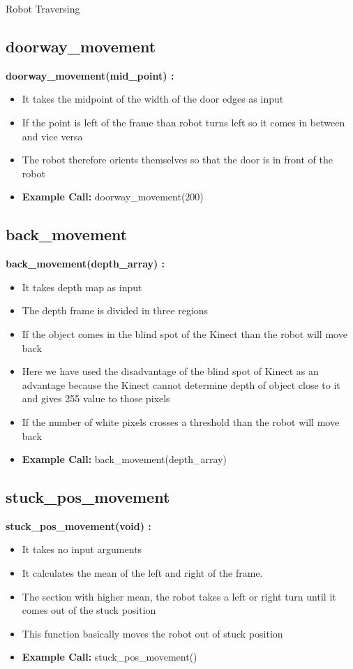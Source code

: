 \documentclass[10pt, a4paper]{beamer}
\begin{document}
\begin{frame}[allowframebreaks]{Robot Traversing}
  \subsection{doorway\_movement}
    \textbf{doorway\_movement(mid\_point) : }
      \begin{itemize}
       \item It takes the midpoint of the width of the door edges as input
       \item If the point is left of the frame than robot turns left so it comes in between and vice versa
       \item The robot therefore orients themselves so that the door is in front of the robot
       \item \textbf{Example Call:} doorway\_movement(200)
      \end{itemize}
  \framebreak
  \subsection{back\_movement}
    \textbf{back\_movement(depth\_array) : }
      \begin{itemize}
       \item It takes depth map as input
       \item The depth frame is divided in three regions
       \item If the object comes in the blind spot of the Kinect than the robot will move back
       \item Here we have used the disadvantage of the blind spot of Kinect as an advantage because the Kinect cannot determine depth of object close to it and gives 255 value to those pixels
       \item If the number of white pixels crosses a threshold than the robot will move back
       \item \textbf{Example Call:} back\_movement(depth\_array)
      \end{itemize}
   \framebreak
  \subsection{stuck\_pos\_movement}
    \textbf{stuck\_pos\_movement(void) : }
      \begin{itemize}
       \item It takes no input arguments
       \item It calculates the mean of the left and right of the frame. 
       \item The section with higher mean, the robot takes a left or right turn until it comes out of the stuck position
       \item This function basically moves the robot out of stuck position
       \item \textbf{Example Call:} stuck\_pos\_movement()
      \end{itemize}
  \framebreak

\end{frame}
\end{document}
